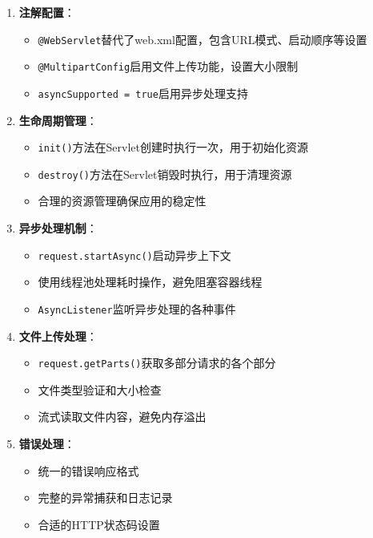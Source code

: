 \begin{enumerate}
\def\labelenumi{\arabic{enumi}.}
\tightlist
\item
  \textbf{注解配置}：

  \begin{itemize}
  \tightlist
  \item
    \texttt{@WebServlet}替代了web.xml配置，包含URL模式、启动顺序等设置
  \item
    \texttt{@MultipartConfig}启用文件上传功能，设置大小限制
  \item
    \texttt{asyncSupported\ =\ true}启用异步处理支持
  \end{itemize}
\item
  \textbf{生命周期管理}：

  \begin{itemize}
  \tightlist
  \item
    \texttt{init()}方法在Servlet创建时执行一次，用于初始化资源
  \item
    \texttt{destroy()}方法在Servlet销毁时执行，用于清理资源
  \item
    合理的资源管理确保应用的稳定性
  \end{itemize}
\item
  \textbf{异步处理机制}：

  \begin{itemize}
  \tightlist
  \item
    \texttt{request.startAsync()}启动异步上下文
  \item
    使用线程池处理耗时操作，避免阻塞容器线程
  \item
    \texttt{AsyncListener}监听异步处理的各种事件
  \end{itemize}
\item
  \textbf{文件上传处理}：

  \begin{itemize}
  \tightlist
  \item
    \texttt{request.getParts()}获取多部分请求的各个部分
  \item
    文件类型验证和大小检查
  \item
    流式读取文件内容，避免内存溢出
  \end{itemize}
\item
  \textbf{错误处理}：

  \begin{itemize}
  \tightlist
  \item
    统一的错误响应格式
  \item
    完整的异常捕获和日志记录
  \item
    合适的HTTP状态码设置
  \end{itemize}
\end{enumerate}

